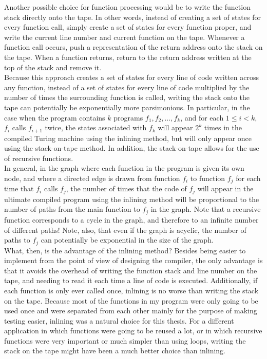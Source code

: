 \documentclass{report}
\begin{document}
Another possible choice for function processing would be to write the function stack directly onto the tape. In other words, instead of creating a set of states for every function call, simply create a set of states for every function proper, and write the current line number and current function on the tape. Whenever a function call occurs, push a representation of the return address onto the stack on the tape. When a function returns, return to the return address written at the top of the stack and remove it. \\

Because this approach creates a set of states for every line of code written across any function, instead of a set of states for every line of code multiplied by the number of times the surrounding function is called, writing the stack onto the tape can potentially be exponentially more parsimonious. In particular, in the case when the program contains $k$ programs $f_1, f_2, \dots, f_k$, and for each $1 \le i < k$, $f_i$ calls $f_{i+1}$ twice, the states associated with $f_k$ will appear $2^k$ times in the compiled Turing machine using the inlining method, but will only appear once using the stack-on-tape method. In addition, the stack-on-tape allows for the use of recursive functions.\\

In general, in the graph where each function in the program is given its own node, and where a directed edge is drawn from function $f_i$ to function $f_j$ for each time that $f_i$ calls $f_j$, the number of times that the code of $f_j$ will appear in the ultimate compiled program using the inlining method will be proportional to the number of paths from the main function to $f_j$ in the graph. Note that a recursive function corresponds to a cycle in the graph, and therefore to an infinite number of different paths! Note, also, that even if the graph is acyclic, the number of paths to $f_j$ can potentially be exponential in the size of the graph. \\

What, then, is the advantage of the inlining method? Besides being easier to implement from the point of view of designing the compiler, the only advantage is that it avoids the overhead of writing the function stack and line number on the tape, and needing to read it each time a line of code is executed. Additionally, if each function is only ever called once, inlining is no worse than writing the stack on the tape. Because most of the functions in my program were only going to be used once and were separated from each other mainly for the purpose of making testing easier, inlining was a natural choice for this thesis. For a different application in which functions were going to be reused a lot, or in which recursive functions were very important or much simpler than using loops, writing the stack on the tape might have been a much better choice than inlining. \\
\end{document}
